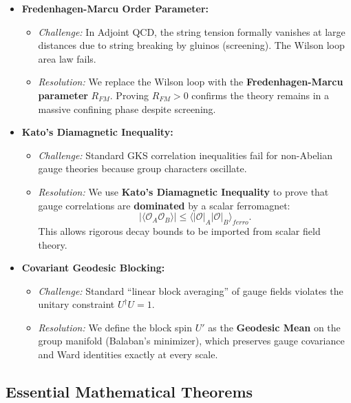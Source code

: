 \begin{itemize}
    \item \textbf{Fredenhagen-Marcu Order Parameter:}
    \begin{itemize}
        \item \textit{Challenge:} In Adjoint QCD, the string tension formally vanishes at large distances due to string breaking by gluinos (screening). The Wilson loop area law fails.
        \item \textit{Resolution:} We replace the Wilson loop with the \textbf{Fredenhagen-Marcu parameter} $R_{FM}$. Proving $R_{FM} > 0$ confirms the theory remains in a massive confining phase despite screening.
    \end{itemize}

    \item \textbf{Kato's Diamagnetic Inequality:}
    \begin{itemize}
        \item \textit{Challenge:} Standard GKS correlation inequalities fail for non-Abelian gauge theories because group characters oscillate.
        \item \textit{Resolution:} We use \textbf{Kato's Diamagnetic Inequality} to prove that gauge correlations are \textbf{dominated} by a scalar ferromagnet:
        \[
        |\langle \mathcal{O}_A \mathcal{O}_B \rangle| \le \langle |\mathcal{O}|_A |\mathcal{O}|_B \rangle_{ferro}.
        \]
        This allows rigorous decay bounds to be imported from scalar field theory.
    \end{itemize}

    \item \textbf{Covariant Geodesic Blocking:}
    \begin{itemize}
        \item \textit{Challenge:} Standard ``linear block averaging'' of gauge fields violates the unitary constraint $U^\dagger U = 1$.
        \item \textit{Resolution:} We define the block spin $U'$ as the \textbf{Geodesic Mean} on the group manifold (Balaban's minimizer), which preserves gauge covariance and Ward identities exactly at every scale.
    \end{itemize}
\end{itemize}

\subsection{Essential Mathematical Theorems}

